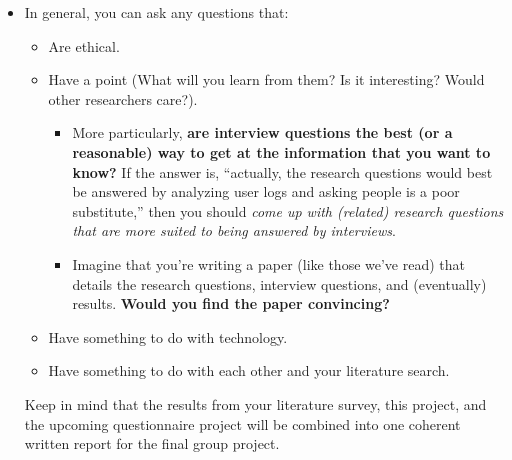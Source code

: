 \documentclass{article}
\begin{document}
\begin{itemize}
    \item In general, you can ask any questions that:
    \begin{itemize}
        \item Are ethical.
        \item Have a point (What will you learn from them? Is it interesting? Would other researchers care?).
        \begin{itemize}
            \item More particularly, \textbf{are interview questions the best (or a reasonable) way to get at the information that you want to know?} If the answer is, ``actually, the research questions would best be answered by analyzing user logs and asking people is a poor substitute,'' then you should \textit{come up with (related) research questions that are more suited to being answered by interviews}.
            \item Imagine that you're writing a paper (like those we've read) that details the research questions, interview questions, and (eventually) results. \textbf{Would you find the paper convincing?}
        \end{itemize}
        \item Have something to do with technology.
        \item Have something to do with each other and your literature search.
    \end{itemize}
    Keep in mind that the results from your literature survey, this project, and the upcoming questionnaire project will be combined into one coherent written report for the final group project.
\end{itemize}
\end{document}
